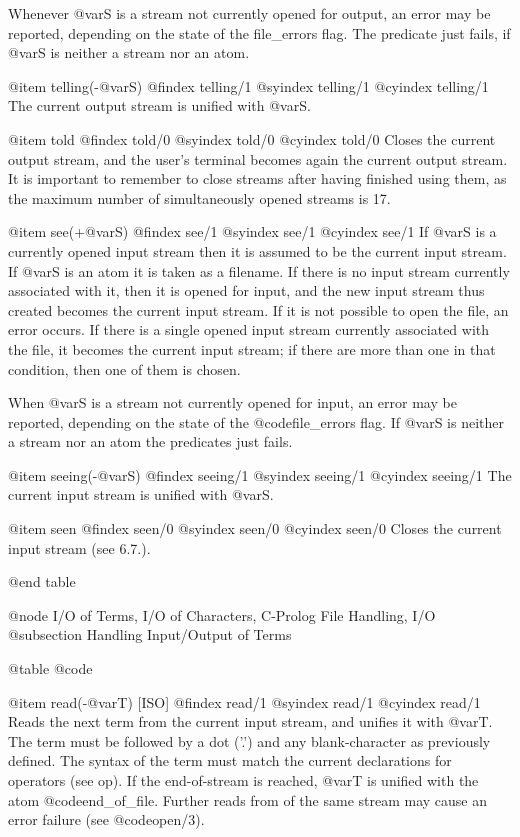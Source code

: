 {{{{{{Whenever @var{S} is a stream not currently opened for output, an error
may be reported, depending on the state of the file_errors flag. The
predicate just fails, if @var{S} is neither a stream nor an atom.

@item telling(-@var{S})
@findex telling/1
@syindex telling/1
@cyindex telling/1
The current output stream is unified with @var{S}.

@item told
@findex told/0
@syindex told/0
@cyindex told/0
Closes the current output stream, and the user's terminal becomes again
the current output stream. It is important to remember to close streams
after having finished using them, as the maximum number of
simultaneously opened streams is 17.

@item see(+@var{S})
@findex see/1
@syindex see/1
@cyindex see/1
If @var{S} is a currently opened input stream then it is assumed to be
the current input stream. If @var{S} is an atom it is taken as a
filename. If there is no input stream currently associated with it, then
it is opened for input, and the new input stream thus created becomes
the current input stream. If it is not possible to open the file, an
error occurs.  If there is a single opened input stream currently
associated with the file, it becomes the current input stream; if there
are more than one in that condition, then one of them is chosen.

When @var{S} is a stream not currently opened for input, an error may be
reported, depending on the state of the @code{file_errors} flag. If
@var{S} is neither a stream nor an atom the predicates just fails.

@item seeing(-@var{S})
@findex seeing/1
@syindex seeing/1
@cyindex seeing/1
The current input stream is unified with @var{S}.

@item seen
@findex seen/0
@syindex seen/0
@cyindex seen/0
Closes the current input stream (see 6.7.).

@end table

@node I/O of Terms, I/O of Characters, C-Prolog File Handling, I/O
@subsection Handling Input/Output of Terms

@table @code

@item read(-@var{T}) [ISO]
@findex read/1
@syindex read/1
@cyindex read/1
Reads the next term from the current input stream, and unifies it with
@var{T}. The term must be followed by a dot ('.') and any blank-character
as previously defined. The syntax of the term must match the current
declarations for operators (see op). If the end-of-stream is reached, 
@var{T} is unified with the atom @code{end_of_file}. Further reads from of 
the same stream may cause an error failure (see @code{open/3}).

}}}}}}
